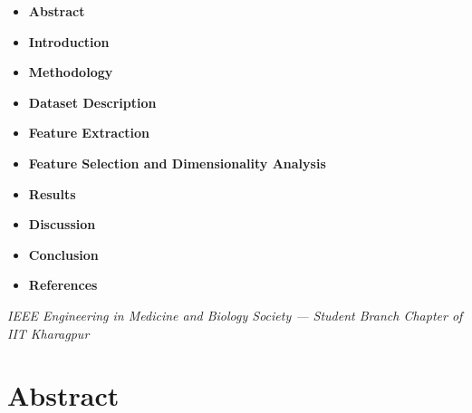\documentclass[12pt,a4paper]{article}
\begin{document}
\begin{itemize}[label=\textbullet, itemsep=1.3em, leftmargin=2.0em]
    \item \textbf{Abstract} \dotfill \pageref{sec:abstract}
    \item \textbf{Introduction} \dotfill \pageref{sec:introduction}
    \item \textbf{Methodology} \dotfill \pageref{sec:methodology}
    \item \textbf{Dataset Description} \dotfill \pageref{sec:dataset}
    \item \textbf{Feature Extraction} \dotfill \pageref{sec:features}
    \item \textbf{Feature Selection and Dimensionality Analysis} \dotfill \pageref{sec:selection}
    \item \textbf{Results} \dotfill \pageref{sec:results}
    \item \textbf{Discussion} \dotfill \pageref{sec:discussion}
    \item \textbf{Conclusion} \dotfill \pageref{sec:conclusion}
    \item \textbf{References} \dotfill \pageref{sec:references}
\end{itemize}

\vfill
\begin{center}
    \footnotesize\textit{IEEE Engineering in Medicine and Biology Society --- Student Branch Chapter of IIT Kharagpur}
\end{center}

\newpage
\section*{Abstract}\label{sec:abstract}
\end{document}
